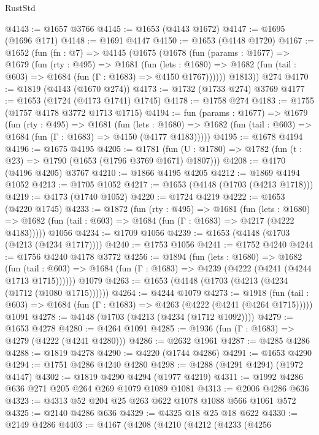 \begin{lexlean}{RustStd}
\begin{coremodule}
@4143 := @1657 @3766
@4145 := @1653 (@4143 @1672)
@4147 := @1695 (@1696 @171)
@4148 := @1691 @4147
@4150 := @1653 (@4148 @1720)
@4167 := @1652
    (fun (fn : @7) =>
    @4145
      (@1675
        (@1678
          (fun (params : @1677) =>
          @1679
            (fun (rty : @495) =>
            @1681
              (fun (lets : @1680) =>
              @1682 (fun (tail : @603) => @1684 (fun (Γ : @1683) => @4150 @1767))))))
        @1813))
    @274
@4170 := @1819 (@4143 (@1670 @274))
@4173 := @1732 (@1733 @274) @3769
@4177 := @1653 (@1724 (@4173 @1741) @1745)
@4178 := @1758 @274
@4183 := @1755 (@1757 @4178 @3772 @1713 @1715)
@4194 := fun (params : @1677) =>
  @1679
    (fun (rty : @495) =>
    @1681
      (fun (lets : @1680) =>
      @1682 (fun (tail : @603) => @1684 (fun (Γ : @1683) => @4150 (@4177 @4183)))))
@4195 := @1678 @4194
@4196 := @1675 @4195
@4205 := @1781 (fun (U : @1780) => @1782 (fun (t : @23) => @1790 (@1653 (@1796 @3769 @1671) @1807)))
@4208 := @4170 (@4196 @4205) @3767
@4210 := @1866 @4195 @4205
@4212 := @1869 @4194 @1052
@4213 := @1705 @1052
@4217 := @1653 (@4148 (@1703 (@4213 @1718)))
@4219 := @4173 (@1740 @1052)
@4220 := @1724 @4219
@4222 := @1653 (@4220 @1745)
@4233 := @1872
    (fun (rty : @495) =>
    @1681
      (fun (lets : @1680) =>
      @1682 (fun (tail : @603) => @1684 (fun (Γ : @1683) => @4217 (@4222 @4183)))))
    @1056
@4234 := @1709 @1056
@4239 := @1653 (@4148 (@1703 (@4213 (@4234 @1717))))
@4240 := @1753 @1056
@4241 := @1752 @4240
@4244 := @1756 @4240 @4178 @3772
@4256 := @1894
    (fun (lets : @1680) =>
    @1682
      (fun (tail : @603) => @1684 (fun (Γ : @1683) => @4239 (@4222 (@4241 (@4244 @1713 @1715))))))
    @1079
@4263 := @1653 (@4148 (@1703 (@4213 (@4234 (@1712 (@1080 @1715))))))
@4264 := @4244 @1079
@4273 := @1918
    (fun (tail : @603) => @1684 (fun (Γ : @1683) => @4263 (@4222 (@4241 (@4264 @1715)))))
    @1091
@4278 := @4148 (@1703 (@4213 (@4234 (@1712 @1092))))
@4279 := @1653 @4278
@4280 := @4264 @1091
@4285 := @1936 (fun (Γ : @1683) => @4279 (@4222 (@4241 @4280)))
@4286 := @2632 @1961
@4287 := @4285 @4286
@4288 := @1819 @4278
@4290 := @4220 (@1744 @4286)
@4291 := @1653 @4290
@4294 := @1751 @4286 @4240 @4280
@4298 := @4288 (@4291 @4294) (@1972 @4147)
@4302 := @1819 @4290 @4294 (@1977 @4219)
@4311 := @1992 @4286 @636 @271 @205 @264 @269 @1079 @1089 @1081
@4313 := @2006 @4286 @636
@4323 := @4313 @52 @204 @25 @263 @622 @1078 @1088 @566 @1061 @572
@4325 := @2140 @4286 @636
@4329 := @4325 @18 @25 @18 @622
@4330 := @2149 @4286
@4403 := @4167
    (@4208
      (@4210
        (@4212
          (@4233
            (@4256

\end{coremodule}
\end{lexlean}
